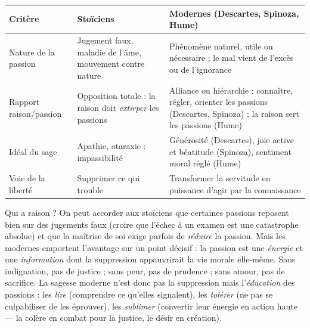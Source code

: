 \documentclass[11pt]{article}
\begin{document}
\begin{center}
\begin{tabularx}{\linewidth}{|l|X|X|}
\hline
\rowcolor{popblueL} \textbf{Critère} & \textbf{Stoïciens} & \textbf{Modernes (Descartes, Spinoza, Hume)} \\
\hline
Nature de la passion & Jugement faux, maladie de l'âme, mouvement contre nature & Phénomène naturel, utile ou nécessaire ; le mal vient de l'excès ou de l'ignorance \\
\hline
Rapport raison/passion & Opposition totale : la raison doit \emph{extirper} les passions & Alliance ou hiérarchie : connaître, régler, orienter les passions (Descartes, Spinoza) ; la raison sert les passions (Hume) \\
\hline
Idéal du sage & Apathie, ataraxie : impassibilité & Générosité (Descartes), joie active et béatitude (Spinoza), sentiment moral réglé (Hume) \\
\hline
Voie de la liberté & Supprimer ce qui trouble & Transformer la servitude en puissance d'agir par la connaissance \\
\hline
\end{tabularx}
\end{center}

Qui a raison ? On peut accorder aux stoïciens que certaines passions reposent bien sur des jugements faux (croire que l'échec à un examen est une catastrophe absolue) et que la maîtrise de soi exige parfois de \emph{réduire} la passion. Mais les modernes emportent l'avantage sur un point décisif : la passion est une \emph{énergie} et une \emph{information} dont la suppression appauvrirait la vie morale elle-même. Sans indignation, pas de justice ; sans peur, pas de prudence ; sans amour, pas de sacrifice. La sagesse moderne n'est donc pas la suppression mais l'\emph{éducation} des passions : les \emph{lire} (comprendre ce qu'elles signalent), les \emph{tolérer} (ne pas se culpabiliser de les éprouver), les \emph{sublimer} (convertir leur énergie en action haute — la colère en combat pour la justice, le désir en création).
\end{document}
